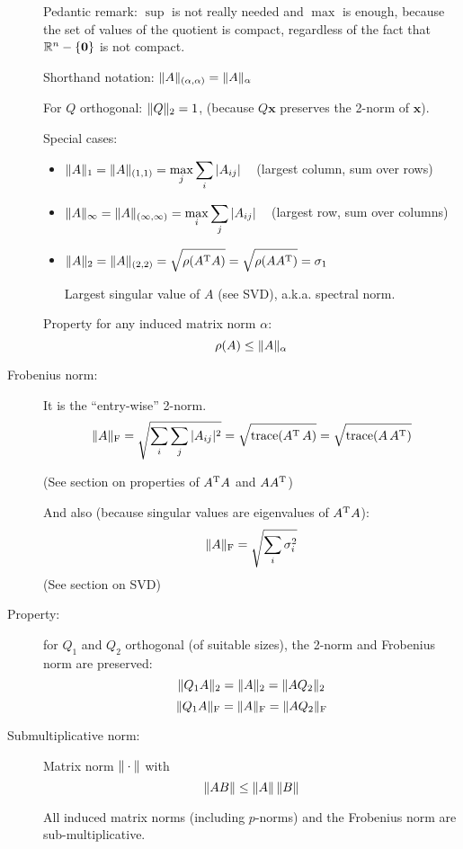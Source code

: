 \documentclass[
  12pt,
  paper=a4,
]{scrartcl} %
\begin{document}
\begin{description}
Pedantic remark: $\sup$ is not really needed and $\max$ is enough, because the set of values of the quotient is compact, regardless of the fact that $\mathbb R^n-\{\bm 0\}$ is not compact.

Shorthand notation: $\|A\|_{(\alpha,\alpha)}
=\|A\|_{\alpha}$

For $Q$ orthogonal: $\|Q\|_{2} = 1$, (because $Q\bm x$ preserves the 2-norm of $\bm x$).

Special cases:
\begin{itemize}
    \item $\displaystyle \|A\|_1 = \|A\|_{(1,1)} = \max_j \sum_i |A_{ij}|$
    \,\,\,
    (largest column, sum over rows)

    \item $\displaystyle \|A\|_\infty = \|A\|_{(\infty,\infty)} = \max_i \sum_j |A_{ij}|$
    \,\,\,
    (largest row, sum over columns)
    
    \item $\displaystyle \|A\|_2 = \|A\|_{(2,2)} = \sqrt{\rho(A^{\mathrm{T}} A)}= \sqrt{\rho(A A^{\mathrm{T}})} = \sigma_1$
    
    Largest singular value of $A$ (see SVD), a.k.a. spectral norm.
\end{itemize}
\vspace{0.5em}

Property for any induced matrix norm $\alpha$: \[\rho(A) \le \|A\|_\alpha\]

\newpage
\item[Frobenius norm:]

It is the ``entry-wise'' 2-norm.
\[
\|A\|_{\text{F}}
    = \sqrt{\sum_i\sum_j |A_{ij}|^2}
    = \sqrt{\operatorname{trace}(A^{\mathrm{T}}\, A)}
    = \sqrt{\operatorname{trace}(A\, A^{\mathrm{T}})}
\]

(See section on properties of $A^{\mathrm{T}} A$ and $AA^{\mathrm{T}}$)

And also (because singular values are eigenvalues of $A^{\mathrm{T}} A$):
\[
\|A\|_{\text{F}}
    = \sqrt{\sum_i\sigma_i^2}
\]
(See section on SVD)

\item[Property:] for $Q_1$ and $Q_2$ orthogonal (of suitable sizes), the 2-norm and Frobenius norm are preserved:
\[\|Q_1A\|_2 = \|A\|_2 = \|AQ_2\|_2 \]
\[\|Q_1A\|_{\text{F}} = \|A\|_{\text{F}} = \|AQ_2\|_{\text{F}} \]

\item[Submultiplicative norm:] Matrix norm $\|\cdot\|$ with
\[
\|AB\|\le \|A\|\,\|B\|
\]

All induced matrix norms (including $p$-norms) and the Frobenius norm are sub-multiplicative.


\end{description}
\end{document}
